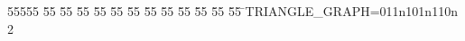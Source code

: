 %
%
\begin{tabbing}
55555 \= 55 \= 55 \= 55 \= 55 \= 55 \= 55 \= 55 \= 55 \= 55 \= 55 \= 55 \= 55 \= \>TRIANGLE\_GRAPH=011n101n110n\\[0pt]
2\>\end{tabbing}
